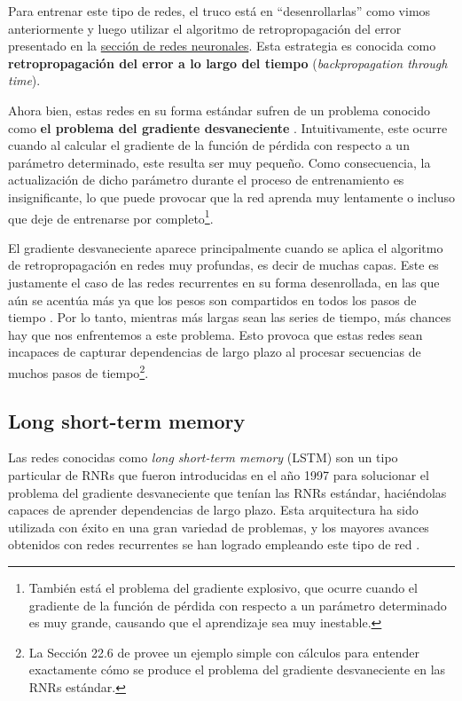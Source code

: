 \documentclass[../../main.tex]{subfiles}
\begin{document}
Para entrenar este tipo de redes, el truco está en ``desenrollarlas'' como vimos
anteriormente y luego utilizar el algoritmo de retropropagación del error presentado en la
\hyperref[sec:rna]{sección de redes neuronales}. Esta estrategia es conocida como
\textbf{retropropagación del error a lo largo del tiempo} (\textit{backpropagation through
time}).

Ahora bien, estas redes en su forma estándar sufren de un problema conocido como
\textbf{el problema del gradiente desvaneciente} \cite{vanishing-gradient}.
Intuitivamente, este ocurre cuando al calcular el gradiente de la función de pérdida con
respecto a un parámetro determinado, este resulta ser muy pequeño. Como consecuencia, la
actualización de dicho parámetro durante el proceso de entrenamiento es insignificante, lo
que puede provocar que la red aprenda muy lentamente o incluso que deje de entrenarse por
completo\footnote{También está el problema del gradiente explosivo, que ocurre cuando el
gradiente de la función de pérdida con respecto a un parámetro determinado es muy grande,
causando que el aprendizaje sea muy inestable.}.

El gradiente desvaneciente aparece principalmente cuando se aplica el algoritmo de
retropropagación en redes muy profundas, es decir de muchas capas. Este es justamente el
caso de las redes recurrentes en su forma desenrollada, en las que aún se acentúa más ya
que los pesos son compartidos en todos los pasos de tiempo \cite{deep-learning}. Por lo
tanto, mientras más largas sean las series de tiempo, más chances hay que nos enfrentemos
a este problema. Esto provoca que estas redes sean incapaces de capturar dependencias de
largo plazo al procesar secuencias de muchos pasos de tiempo\footnote{La Sección 22.6 de
\cite{ai-a-modern-approach} provee un ejemplo simple con cálculos para entender
exactamente cómo se produce el problema del gradiente desvaneciente en las RNRs
estándar.}.

\subsection{Long short-term memory}
Las redes conocidas como \textit{long short-term memory} (LSTM) son un tipo particular de
RNRs que fueron introducidas en el año 1997 \cite{lstm-paper-1997} para solucionar el
problema del gradiente desvaneciente que tenían las RNRs estándar, haciéndolas capaces
de aprender dependencias de largo plazo. Esta arquitectura ha sido utilizada con éxito en
una gran variedad de problemas, y los mayores avances obtenidos con redes recurrentes se
han logrado empleando este tipo de red \cite{colahs-blog-lstm-2015}.
\end{document}
